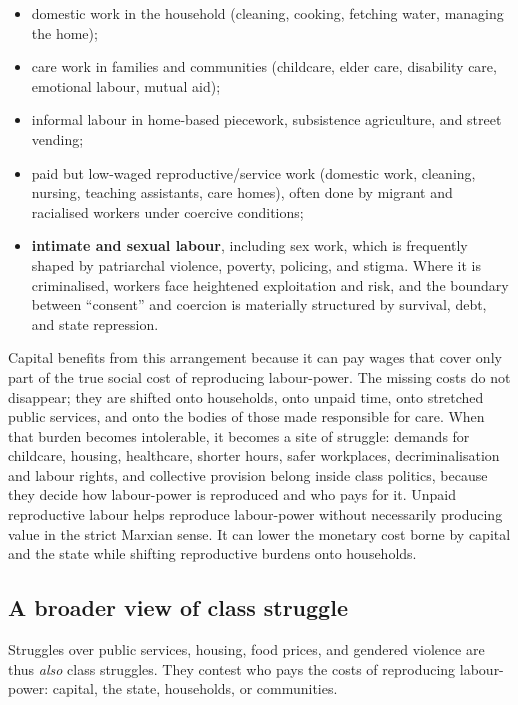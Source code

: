 \begin{itemize}[leftmargin=1.5em]
  \item domestic work in the household (cleaning, cooking, fetching water, managing the home);
  \item care work in families and communities (childcare, elder care, disability care, emotional labour, mutual aid);
  \item informal labour in home-based piecework, subsistence agriculture, and street vending;
  \item paid but low-waged reproductive/service work (domestic work, cleaning, nursing, teaching assistants, care homes),
  often done by migrant and racialised workers under coercive conditions;
  \item \textbf{intimate and sexual labour}, including sex work, which is frequently shaped by patriarchal violence,
  poverty, policing, and stigma. Where it is criminalised, workers face heightened exploitation and risk, and the
  boundary between ``consent'' and coercion is materially structured by survival, debt, and state repression.
\end{itemize}

Capital benefits from this arrangement because it can pay wages that cover only part of the true social cost of reproducing labour-power. The missing costs do not disappear;
they are shifted onto households, onto unpaid time, onto stretched public services, and onto the bodies of those made responsible for care. When that burden becomes intolerable,
it becomes a site of struggle: demands for childcare, housing, healthcare, shorter hours, safer workplaces, decriminalisation and labour rights, and collective provision belong inside class politics, because they decide how labour-power is reproduced and who pays
for it. Unpaid reproductive labour helps reproduce labour-power without necessarily producing value in the strict Marxian sense. It can lower the monetary cost borne by capital and the state while shifting reproductive burdens onto households.


\subsection{A broader view of class struggle}

Struggles over public services, housing, food prices, and gendered violence
are thus \emph{also} class struggles. They contest who pays the costs of
reproducing labour-power: capital, the state, households, or communities.

